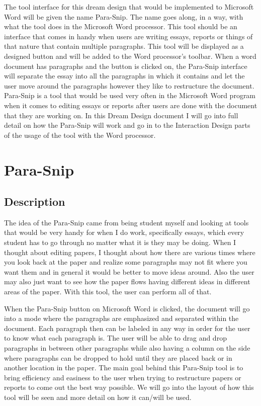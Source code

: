 \documentclass{article}
\begin{document}
	The tool interface for this dream design that would be implemented to Microsoft Word will be given the name Para-Snip. The name goes along, in a way, with what the tool does in the Microsoft Word processor. This tool should be an interface that comes in handy when users are writing essays, reports or things of that nature that contain multiple paragraphs. This tool will be displayed as a designed button and will be added to the Word processor's toolbar. When a word document has paragraphs and the button is clicked on, the Para-Snip interface will separate the essay into all the paragraphs in which it contains and let the user move around the paragraphs however they like to restructure the document. Para-Snip is a tool that would be used very often in the Microsoft Word program when it comes to editing essays or reports after users are done with the document that they are working on. In this Dream Design document I will go into full detail on how the Para-Snip will work and go in to the Interaction Design parts of the usage of the tool with the Word processor.

\section{Para-Snip}

\subsection{Description}
	The idea of the Para-Snip came from being student myself and looking at tools that would be very handy for when I do work, specifically essays, which every student has to go through no matter what it is they may be doing. When I thought about editing papers, I thought about how there are various times where you look back at the paper and realize some paragraphs may not fit where you want them and in general it would be better to move ideas around. Also the user may also just want to see how the paper flows having different ideas in different areas of the paper. With this tool, the user can perform all of that.

	When the Para-Snip button on Microsoft Word is clicked, the document will go into a mode where the paragraphs are emphasized and separated within the document. Each paragraph then can be labeled in any way in order for the user to know what each paragraph is. The user will be able to drag and drop  paragraphs in between other paragraphs while also having a column on the side where paragraphs can be dropped to hold until they are placed back or in another location in the paper. The main goal behind this Para-Snip tool is to bring efficiency and easiness to the user when trying to restructure papers or reports to come out the best way possible. We will go into the layout of how this tool will be seen and more detail on how it can/will be used.
\end{document}
